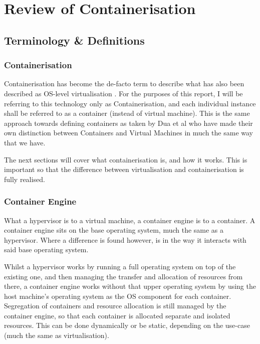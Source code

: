 \chapter{Review of Containerisation}
\label{chap:containerisationReview}

\section{Terminology \& Definitions}

\subsection{Containerisation}
\label{sec:containerisation}
Containerisation has become the de-facto term to describe what has also been described as OS-level virtualisation \citep{hogg_2014}. For the purposes of this report, I will be referring to this technology only as Containerisation, and each individual instance shall be referred to as a container (instead of virtual machine). This is the same approach towards defining containers as taken by Dua et al \citep{dua14} who have made their own distinction between Containers and Virtual Machines in much the same way that we have.

The next sections will cover what containerisation is, and how it works. This is important so that the difference between virtualisation and containerisation is fully realised.

\subsection{Container Engine}
\label{Container Engine}
What a hypervisor is to a virtual machine, a container engine is to a container. A container engine sits on the base operating system, much the same as a hypervisor. Where a difference is found however, is in the way it interacts with said base operating system.

Whilst a hypervisor works by running a full operating system on top of the existing one, and then managing the transfer and allocation of resources from there, a container engine works without that upper operating system by using the host machine's operating system as the OS component for each container. Segregation of containers and resource allocation is still managed by the container engine, so that each container is allocated separate and isolated resources. This can be done dynamically or be static, depending on the use-case (much the same as virtualisation).

